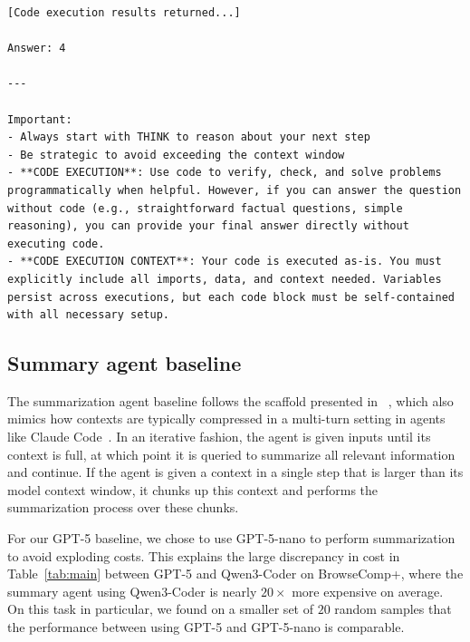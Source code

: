 \begin{lstlisting}[style=customstyle]
[Code execution results returned...]

Answer: 4

---

Important: 
- Always start with THINK to reason about your next step
- Be strategic to avoid exceeding the context window
- **CODE EXECUTION**: Use code to verify, check, and solve problems programmatically when helpful. However, if you can answer the question without code (e.g., straightforward factual questions, simple reasoning), you can provide your final answer directly without executing code.
- **CODE EXECUTION CONTEXT**: Your code is executed as-is. You must explicitly include all imports, data, and context needed. Variables persist across executions, but each code block must be self-contained with all necessary setup.
\end{lstlisting}

\subsection{Summary agent baseline}
The summarization agent baseline follows the scaffold presented in ~\citet{sun2025scalinglonghorizonllmagent, wu2025resumunlockinglonghorizonsearch, yu2025memagentreshapinglongcontextllm}, which also mimics how contexts are typically compressed in a multi-turn setting in agents like Claude Code~\citep{anthropic_claude_code_subagents}. In an iterative fashion, the agent is given inputs until its context is full, at which point it is queried to summarize all relevant information and continue. If the agent is given a context in a single step that is larger than its model context window, it chunks up this context and performs the summarization process over these chunks.

For our GPT-5 baseline, we chose to use GPT-5-nano to perform summarization to avoid exploding costs. This explains the large discrepancy in cost in Table~\ref{tab:main} between GPT-5 and Qwen3-Coder on BrowseComp+, where the summary agent using Qwen3-Coder is nearly $20\times$ more expensive on average. On this task in particular, we found on a smaller set of $20$ random samples that the performance between using GPT-5 and GPT-5-nano is comparable.
